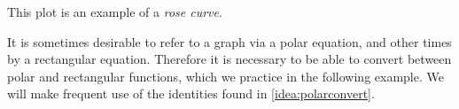 {%
This plot is an example of a \textit{rose curve}.}

It is sometimes desirable to refer to a graph via a polar equation, and other times by a rectangular equation. Therefore it is necessary to be able to convert between polar and rectangular functions, which we practice in the following example. We will make frequent use of the identities found in \autoref{idea:polarconvert}.

